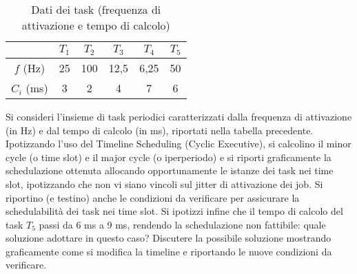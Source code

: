 \begin{Esercizio6}

\begin{table}[!h]
\centering
\caption{Dati dei task (frequenza di attivazione e tempo di calcolo)}
\begin{tabular}{|c|c|c|c|c|c|}
\hline
 & $T_1$ & $T_2$ & $T_3$ & $T_4$ & $T_5$ \\
\hline
$f$ (Hz) & 25 & 100 & 12,5 & 6,25 & 50 \\
\hline
$C_i$ (ms) & 3 & 2 & 4 & 7 & 6 \\
\hline
\end{tabular}
\label{tab:timeline_tasks}
\end{table}

\noindent
Si consideri l'insieme di task periodici caratterizzati dalla frequenza di attivazione
(in Hz) e dal tempo di calcolo (in ms), riportati nella tabella precedente.
Ipotizzando l'uso del Timeline Scheduling (Cyclic Executive), si calcolino
il minor cycle (o time slot) e il major cycle (o iperperiodo) e si riporti
graficamente la schedulazione ottenuta allocando opportunamente le istanze
dei task nei time slot, ipotizzando che non vi siano vincoli sul jitter 
di attivazione dei job. Si riportino (e testino) anche le condizioni da 
verificare per assicurare la schedulabilità dei task nei time slot. Si ipotizzi
infine che il tempo di calcolo del task $T_5$ passi da 6 ms a 9 ms, rendendo la
schedulazione non fattibile: quale soluzione adottare in questo caso? Discutere
la possibile soluzione mostrando graficamente come si modifica la timeline e
riportando le nuove condizioni da verificare.


\end{Esercizio6}


